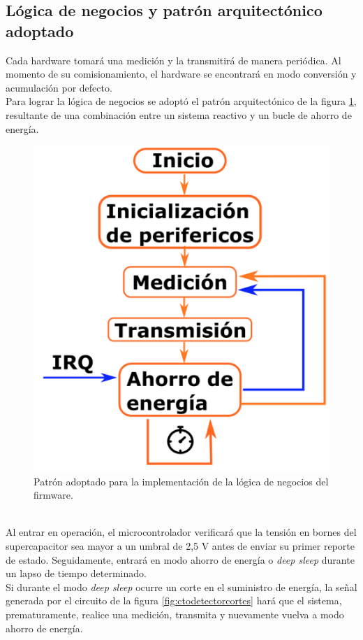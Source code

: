 \subsection{Lógica de negocios y patrón arquitectónico adoptado}
Cada hardware tomará una medición y la transmitirá de manera periódica. Al momento de su comisionamiento, el hardware se encontrará en modo conversión y acumulación por defecto.\\
Para lograr la lógica de negocios se adoptó el patrón arquitectónico de la figura \ref{fig:patronpowersaveloop}, resultante de una combinación entre un sistema reactivo y un bucle de ahorro de energía.\\
\begin{figure}[h!]
	\centering
	\includegraphics[width=0.8\linewidth]{Figures/patron_power_save_loop}
	\caption{Patrón adoptado para la implementación de la lógica de negocios del firmware.}
	\label{fig:patronpowersaveloop}
\end{figure}\\
Al entrar en operación, el microcontrolador verificará que la tensión en bornes del supercapacitor sea mayor a un umbral de 2,5 V antes de enviar su primer reporte de estado. Seguidamente, entrará en modo ahorro de energía o \textit{deep sleep} durante un lapso de tiempo determinado.\\
Si durante el modo \textit{deep sleep} ocurre un corte en el suministro de energía, la señal generada por el circuito de la figura \ref{fig:ctodetectorcortes} hará que el sistema, prematuramente, realice una medición, transmita y nuevamente vuelva a modo ahorro de energía.\\

